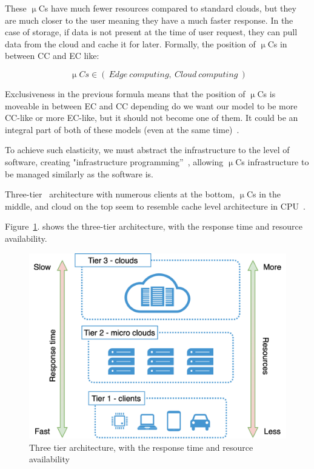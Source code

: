 These $\upmu$Cs have much fewer resources compared to standard clouds, but they are much closer to the user meaning they have a much faster response. In the case of storage, if data is not present at the time of user request, they can pull data from the cloud and cache it for later. Formally, the position of $\upmu$Cs in between CC and EC like:

\begin{equation}~\label{size:eq2}
\upmu Cs \in \left( \ Edge\ computing, \ Cloud\ computing \ \right)
\end{equation}

\noindent
Exclusiveness in the previous formula means that the position of $\upmu$Cs is moveable in between EC and CC depending do we want our model to be more CC-like or more EC-like, but it should not become one of them. It could be an integral part of both of these models (even at the same time)~\cite{HongDSH19, StoicaS21}.

To achieve such elasticity, we must abstract the infrastructure to the level of software, creating "infrastructure programming”~\cite{Fitzgerald}, allowing $\upmu$Cs infrastructure to be managed similarly as the software is.

Three-tier~\label{lab:three-tier} architecture with numerous clients at the bottom, $\upmu$Cs in the middle, and cloud on the top seem to resemble cache level architecture in CPU~\cite{FarshinRMK19}. 

Figure~\ref{fig:fig9}. shows the three-tier architecture, with the response time and resource availability.

\begin{figure}[H]
	\begin{center}
		\includegraphics{images/Figure9}
	\end{center}
	\vspace{-0.5cm}
	\caption{Three tier architecture, with the response time and resource availability}
	\label{fig:fig9}
\end{figure}

